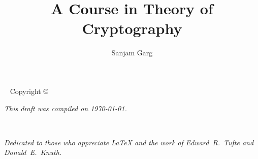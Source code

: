 \documentclass[12pt]{tufte-book}
\title{A Course in Theory of Cryptography}
\author[Sanjam Garg]{Sanjam Garg}
\newcommand{\openepigraph}[2]{%
  \begin{fullwidth}
  \sffamily\large
  \begin{doublespace}
  \noindent\allcaps{#1}\\%
  \noindent\allcaps{#2}%
  \end{doublespace}
  \end{fullwidth}
}
\newcommand{\blankpage}{\newpage\hbox{}\thispagestyle{empty}\newpage}
\begin{document}

\maketitle


\begin{fullwidth}
  ~\vfill
  \thispagestyle{empty}
  \setlength{\parindent}{0pt}
  \setlength{\parskip}{\baselineskip}
  Copyright \copyright\ \the\year\ \thanklessauthor


  \par{}


  \par \doclicenseThis

  \par\textit{This draft was compiled on \today.}
\end{fullwidth}

\tableofcontents



\iffalse
  \cleardoublepage
  ~\vfill

  \begin{doublespace}
    \noindent\fontsize{18}{22}\selectfont\itshape
    \nohyphenation
    Dedicated to those who appreciate \LaTeX{}
    and the work of \mbox{Edward R.~Tufte}
    and \mbox{Donald E.~Knuth}.
  \end{doublespace}
  \vfill
  \vfill
\end{document}
